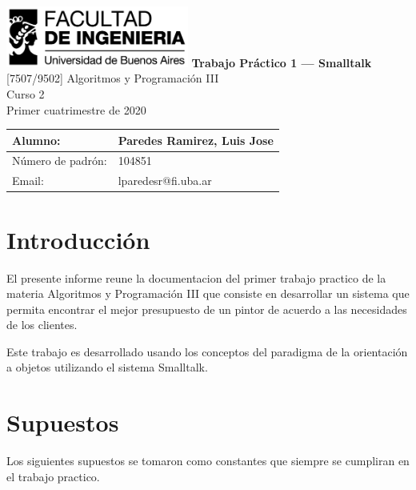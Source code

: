 \documentclass[titlepage,a4paper]{article}
\begin{document}
\begin{titlepage} %
	\hfill\includegraphics[width=6cm]{logofiuba.jpg}
    \centering
    \vfill
    \Huge \textbf{Trabajo Práctico 1 — Smalltalk}
    \vskip2cm
    \Large [7507/9502] Algoritmos y Programación III\\
    Curso 2 \\ %
    Primer cuatrimestre de 2020 
    \vfill
    \begin{tabular}{ | l | l | } %
      \hline
      Alumno: & Paredes Ramirez, Luis Jose \\ \hline
      Número de padrón: & 104851 \\ \hline
      Email: & lparedesr@fi.uba.ar \\ \hline
  	\end{tabular}
    \vfill
    \vfill
\end{titlepage}

\tableofcontents %
\newpage

\section{Introducción}\label{sec:intro}
  El presente informe reune la documentacion del primer trabajo practico de la materia
  Algoritmos y Programación III que consiste en desarrollar un sistema que permita encontrar el mejor 
  presupuesto de un pintor de acuerdo a las necesidades de los clientes. \newline

  Este trabajo es desarrollado usando los conceptos del paradigma de la orientación a objetos
  utilizando el sistema Smalltalk.


\section{Supuestos}\label{sec:supuestos}

Los siguientes supuestos se tomaron como constantes que siempre se cumpliran en el trabajo practico.
\end{document}
